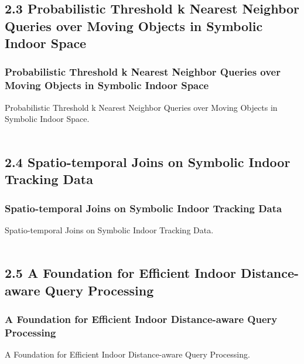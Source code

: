\documentclass{beamer}
\begin{document}
\subsection{2.3 Probabilistic Threshold k Nearest Neighbor Queries over Moving Objects in Symbolic Indoor Space} %

\begin{frame}
\frametitle{Probabilistic Threshold k Nearest Neighbor Queries over Moving Objects in Symbolic Indoor Space}
Probabilistic Threshold k Nearest Neighbor Queries over Moving Objects in Symbolic Indoor Space.~\cite{DBLP:conf/edbt/YangLJ10}\\~\\


\end{frame}


\subsection{2.4 Spatio-temporal Joins on Symbolic Indoor Tracking Data} %

\begin{frame}
\frametitle{Spatio-temporal Joins on Symbolic Indoor Tracking Data}
Spatio-temporal Joins on Symbolic Indoor Tracking Data.~\cite{DBLP:conf/icde/LuYCJ11}\\~\\


\end{frame}


\subsection{2.5 A Foundation for Efficient Indoor Distance-aware Query Processing} %

\begin{frame}
\frametitle{A Foundation for Efficient Indoor Distance-aware Query Processing}
A Foundation for Efficient Indoor Distance-aware Query Processing.~\cite{DBLP:conf/icde/LuCJ12}\\~\\


\end{frame}
\end{document}
